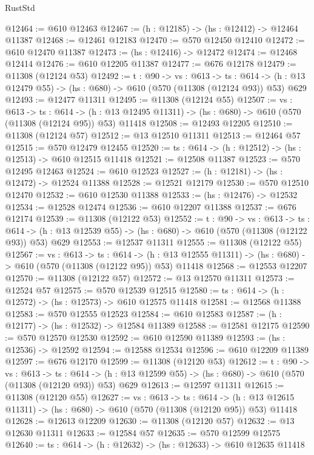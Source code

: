 \begin{lexlean}{RustStd}
\begin{coremodule}
@12464 := @610 @12463
@12467 := (h : @12185) -> (hs : @12412) -> @12464 @11387
@12468 := @12461 @12183
@12470 := @570 @12450 @12410
@12472 := @610 @12470 @11387
@12473 := (hs : @12416) -> @12472
@12474 := @12468 @12414
@12476 := @610 @12205 @11387
@12477 := @676 @12178
@12479 := @11308 (@12124 @53)
@12492 := {t : @90} ->
  {vs : @613} ->
  {ts : @614} -> (h : @13 @12479 @55) -> (hs : @680) -> @610 (@570 (@11308 (@12124 @93)) @53) @629
@12493 := @12477 @11311
@12495 := @11308 (@12124 @55)
@12507 := {vs : @613} ->
  {ts : @614} ->
  (h : @13 @12495 @11311) -> (hs : @680) -> @610 (@570 (@11308 (@12124 @95)) @53) @11418
@12508 := @12493 @12205
@12510 := @11308 (@12124 @57)
@12512 := @13 @12510 @11311
@12513 := @12464 @57
@12515 := @570 @12479 @12455
@12520 := {ts : @614} -> (h : @12512) -> (hs : @12513) -> @610 @12515 @11418
@12521 := @12508 @11387
@12523 := @570 @12495 @12463
@12524 := @610 @12523
@12527 := (h : @12181) -> (hs : @12472) -> @12524 @11388
@12528 := @12521 @12179
@12530 := @570 @12510 @12470
@12532 := @610 @12530 @11388
@12533 := (hs : @12476) -> @12532
@12534 := @12528 @12474
@12536 := @610 @12207 @11388
@12537 := @676 @12174
@12539 := @11308 (@12122 @53)
@12552 := {t : @90} ->
  {vs : @613} ->
  {ts : @614} -> (h : @13 @12539 @55) -> (hs : @680) -> @610 (@570 (@11308 (@12122 @93)) @53) @629
@12553 := @12537 @11311
@12555 := @11308 (@12122 @55)
@12567 := {vs : @613} ->
  {ts : @614} ->
  (h : @13 @12555 @11311) -> (hs : @680) -> @610 (@570 (@11308 (@12122 @95)) @53) @11418
@12568 := @12553 @12207
@12570 := @11308 (@12122 @57)
@12572 := @13 @12570 @11311
@12573 := @12524 @57
@12575 := @570 @12539 @12515
@12580 := {ts : @614} -> (h : @12572) -> (hs : @12573) -> @610 @12575 @11418
@12581 := @12568 @11388
@12583 := @570 @12555 @12523
@12584 := @610 @12583
@12587 := (h : @12177) -> (hs : @12532) -> @12584 @11389
@12588 := @12581 @12175
@12590 := @570 @12570 @12530
@12592 := @610 @12590 @11389
@12593 := (hs : @12536) -> @12592
@12594 := @12588 @12534
@12596 := @610 @12209 @11389
@12597 := @676 @12170
@12599 := @11308 (@12120 @53)
@12612 := {t : @90} ->
  {vs : @613} ->
  {ts : @614} -> (h : @13 @12599 @55) -> (hs : @680) -> @610 (@570 (@11308 (@12120 @93)) @53) @629
@12613 := @12597 @11311
@12615 := @11308 (@12120 @55)
@12627 := {vs : @613} ->
  {ts : @614} ->
  (h : @13 @12615 @11311) -> (hs : @680) -> @610 (@570 (@11308 (@12120 @95)) @53) @11418
@12628 := @12613 @12209
@12630 := @11308 (@12120 @57)
@12632 := @13 @12630 @11311
@12633 := @12584 @57
@12635 := @570 @12599 @12575
@12640 := {ts : @614} -> (h : @12632) -> (hs : @12633) -> @610 @12635 @11418

\end{coremodule}
\end{lexlean}

